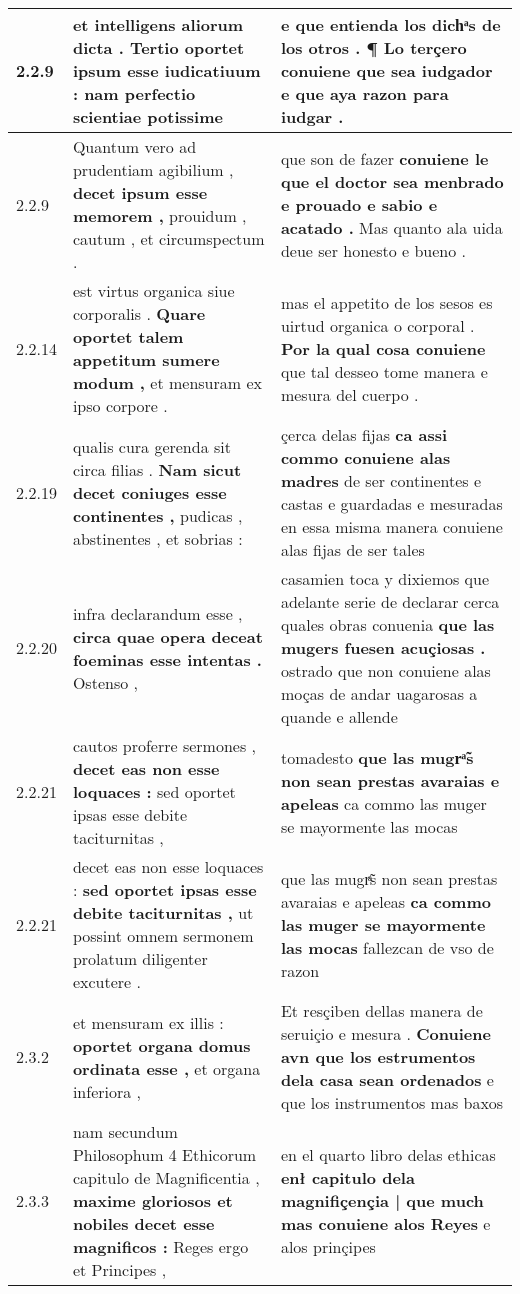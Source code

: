 \begin{tabular}{|p{1cm}|p{6.5cm}|p{6.5cm}|}
2.2.9 & et intelligens aliorum dicta . \textbf{ Tertio oportet ipsum esse iudicatiuum : } nam perfectio scientiae potissime & e que entienda los dichͣs de los otros . \textbf{ ¶ Lo terçero conuiene que sea iudgador } e que aya razon para iudgar . \\\hline
2.2.9 & Quantum vero ad prudentiam agibilium , \textbf{ decet ipsum esse memorem , } prouidum , cautum , et circumspectum . & que son de fazer \textbf{ conuiene le que el doctor sea menbrado e prouado e sabio e acatado . } Mas quanto ala uida deue ser honesto e bueno . \\\hline
2.2.14 & est virtus organica siue corporalis . \textbf{ Quare oportet talem appetitum sumere modum , } et mensuram ex ipso corpore . & mas el appetito de los sesos es uirtud organica o corporal . \textbf{ Por la qual cosa conuiene } que tal desseo tome manera e mesura del cuerpo . \\\hline
2.2.19 & qualis cura gerenda sit circa filias . \textbf{ Nam sicut decet coniuges esse continentes , } pudicas , abstinentes , et sobrias : & çerca delas fijas \textbf{ ca assi commo conuiene alas madres } de ser continentes e castas e guardadas e mesuradas en essa misma manera conuiene alas fijas de ser tales \\\hline
2.2.20 & infra declarandum esse , \textbf{ circa quae opera deceat foeminas esse intentas . } Ostenso , & casamien toca y dixiemos que adelante serie de declarar cerca quales obras conuenia \textbf{ que las mugers fuesen acuçiosas . } ostrado que non conuiene alas moças de andar uagarosas a quande e allende \\\hline
2.2.21 & cautos proferre sermones , \textbf{ decet eas non esse loquaces : } sed oportet ipsas esse debite taciturnitas , & tomadesto \textbf{ que las mugrͣ̃s non sean prestas avaraias e apeleas } ca commo las muger se mayormente las mocas \\\hline
2.2.21 & decet eas non esse loquaces : \textbf{ sed oportet ipsas esse debite taciturnitas , } ut possint omnem sermonem prolatum diligenter excutere . & que las mugrͣ̃s non sean prestas avaraias e apeleas \textbf{ ca commo las muger se mayormente las mocas } fallezcan de vso de razon \\\hline
2.3.2 & et mensuram ex illis : \textbf{ oportet organa domus ordinata esse , } et organa inferiora , & Et resçiben dellas manera de seruiçio e mesura . \textbf{ Conuiene avn que los estrumentos dela casa sean ordenados } e que los instrumentos mas baxos \\\hline
2.3.3 & nam secundum Philosophum 4 Ethicorum capitulo de Magnificentia , \textbf{ maxime gloriosos et nobiles decet esse magnificos : } Reges ergo et Principes , & en el quarto libro delas ethicas \textbf{ enł capitulo dela magnifiçençia | que much mas conuiene alos Reyes } e alos prinçipes \\\hline

\end{tabular}
